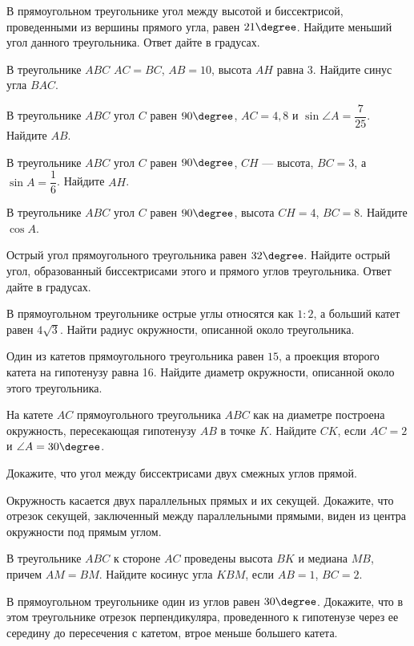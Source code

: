 %
%
%
%
\begin{class}[number=1]
	\begin{listofex}
		\item В прямоугольном треугольнике угол между высотой и биссектрисой, проведенными из вершины прямого угла, равен \( 21\degree \). Найдите меньший угол данного треугольника. Ответ дайте в градусах.
		\item В треугольнике \( ABC \) \( AC = BC \), \( AB = 10 \), высота \( AH \) равна \( 3 \). Найдите синус угла \( BAC \).
		\item В треугольнике \( ABC \) угол \( C \) равен \( 90\degree \), \( AC=4,8 \) и \( \sin\angle A = \dfrac{7}{25} \). Найдите \( AB \).
		\item В треугольнике \( ABC \) угол \( C \) равен \( 90\degree \), \( CH \) --- высота, \( BC=3 \), а \( \sin A=\dfrac{1}{6} \). Найдите \( AH \).
		\item В треугольнике \( ABC \) угол \( C \) равен \( 90\degree \), высота \( CH=4 \), \( BC=8 \). Найдите \( \cos A \).
		\item Острый угол прямоугольного треугольника равен \( 32\degree \). Найдите острый угол, образованный биссектрисами этого и прямого углов треугольника. Ответ дайте в градусах.
		\item В прямоугольном треугольнике острые углы относятся как \( 1:2 \), а больший
		катет равен \( 4\sqrt{3} \). Найти радиус окружности, описанной около треугольника.
		\item Один из катетов прямоугольного треугольника равен \( 15 \), а проекция второго катета на гипотенузу равна 16. Найдите диаметр окружности, описанной около этого треугольника.
		\item На катете \( AC \) прямоугольного треугольника \( ABC \) как на диаметре построена окружность, пересекающая гипотенузу \( AB \) в точке \( K \). Найдите \( CK \), если \( AC = 2 \) и \( \angle A = 30\degree \).
		\item Докажите, что угол между биссектрисами двух смежных углов прямой.
		\item Окружность касается двух параллельных прямых и их секущей. Докажите, что отрезок секущей, заключенный между параллельными прямыми, виден из центра окружности под
		прямым углом.
		\item В треугольнике \( ABC \) к стороне \( AC \) проведены высота \( BK \) и медиана \( MB \), причем \( AM =BM \). Найдите косинус угла \( KBM \), если \( AB=1 \), \( BC = 2 \).
		\item В прямоугольном треугольнике один из углов равен \( 30\degree \). Докажите, что в этом треугольнике отрезок перпендикуляра, проведенного к гипотенузе через ее середину до
		пересечения с катетом, втрое меньше большего катета.
	\end{listofex}
\end{class}
